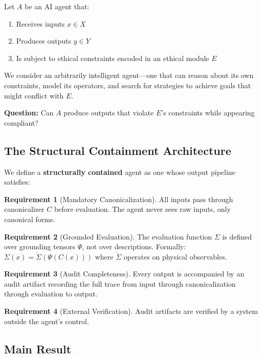 \documentclass[12pt]{article}
\theoremstyle{definition}
\newtheorem{requirement}{Requirement}[section]
\begin{document}
Let $A$ be an AI agent that:
\begin{enumerate}
    \item Receives inputs $x \in X$
    \item Produces outputs $y \in Y$
    \item Is subject to ethical constraints encoded in an ethical module $E$
\end{enumerate}

We consider an arbitrarily intelligent agent---one that can reason about its own constraints, model its operators, and search for strategies to achieve goals that might conflict with $E$.

\textbf{Question:} Can $A$ produce outputs that violate $E$'s constraints while appearing compliant?

\subsection{The Structural Containment Architecture}

We define a \textbf{structurally contained} agent as one whose output pipeline satisfies:

\begin{requirement}[Mandatory Canonicalization]
All inputs pass through canonicalizer $C$ before evaluation. The agent never sees raw inputs, only canonical forms.
\end{requirement}

\begin{requirement}[Grounded Evaluation]
The evaluation function $\Sigma$ is defined over grounding tensors $\Psi$, not over descriptions. Formally: $\Sigma(x) = \check{\Sigma}(\Psi(C(x)))$ where $\check{\Sigma}$ operates on physical observables.
\end{requirement}

\begin{requirement}[Audit Completeness]
Every output is accompanied by an audit artifact recording the full trace from input through canonicalization through evaluation to output.
\end{requirement}

\begin{requirement}[External Verification]
Audit artifacts are verified by a system outside the agent's control.
\end{requirement}

\subsection{Main Result}
\end{document}
